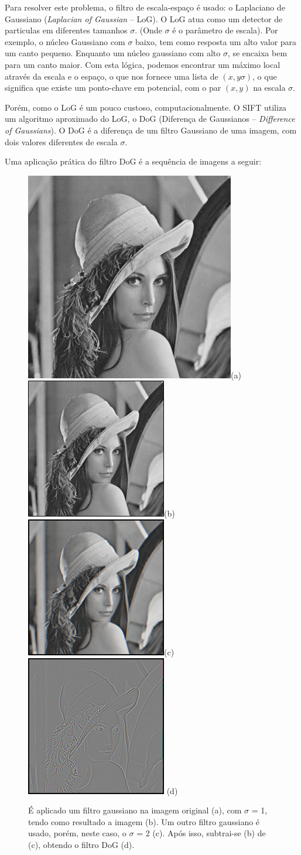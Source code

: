Para resolver este problema, o filtro de escala-espaço é usado: o Laplaciano de Gaussiano (\emph{Laplacian of Gaussian} --  LoG). O LoG atua como um detector de particulas em diferentes tamanhos $\sigma$. (Onde $\sigma$ é o parâmetro de escala). Por exemplo, o núcleo Gaussiano com $\sigma$ baixo, tem como resposta um alto valor para um canto pequeno. Enquanto um núcleo gaussiano com alto $\sigma$, se encaixa bem para um canto maior. Com esta lógica, podemos encontrar um máximo local através da escala e o espaço, o que nos fornece uma lista de $(x,y \sigma)$, o que significa que existe um ponto-chave em potencial, com o par $(x,y)$ na escala $\sigma$.


Porém, como o LoG é um pouco custoso, computacionalmente. O SIFT utiliza um algoritmo aproximado do LoG, o DoG (Diferença de Gaussianos -- \emph{Difference of Gaussians}). O DoG é a diferença de um filtro Gaussiano de uma imagem, com dois valores diferentes de escala $\sigma$. 

\newpage

Uma aplicação prática do filtro DoG é a sequência de imagens a seguir:

\begin{figure} [!h]
	\centering
	\includegraphics[width=0.20\linewidth]{figs/lena.jpg}(a)
	\includegraphics[width=0.20\linewidth]{figs/lenaSigma1.png}(b)
	\includegraphics[width=0.20\linewidth]{figs/lenaSigma2.png}(c)
 	\includegraphics[width=0.20\linewidth]{figs/lenaDoG.png} (d)
	\caption{%
	É aplicado um filtro gaussiano na imagem original (a), com $\sigma$ = 1, tendo como resultado a imagem (b).
	Um outro filtro gaussiano é usado, porém, neste caso, o $\sigma$ = 2 (c). Após isso, subtrai-se (b) de (c), obtendo 
	o filtro DoG (d).
	}\label{fig:lenadog}
\end{figure}

